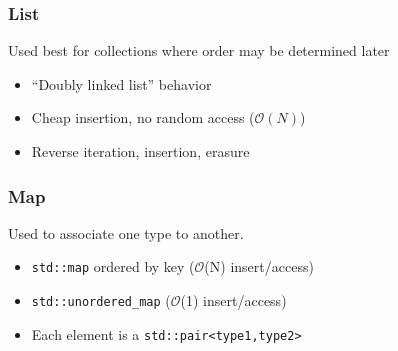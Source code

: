 \documentclass[xcolor=dvipsnames]{beamer}
\begin{document}
\begin{frame}[fragile]
  \frametitle{List}

  Used best for collections where order may be determined later
  \begin{itemize}
  \item ``Doubly linked list'' behavior
  \item Cheap insertion, no random access ($\mathcal{O}(N)$)
  \item Reverse iteration, insertion, erasure
  \end{itemize}

  
\end{frame}

\begin{frame}[fragile]
  \frametitle{Map}

  Used to associate one type to another.
  \begin{itemize}
  \item \texttt{std::map} ordered by key ($\mathcal{O}$(N) insert/access)
  \item \texttt{std::unordered\_map} ($\mathcal{O}$(1) insert/access)
  \item Each element is a \texttt{std::pair<type1,type2>}
  \end{itemize}

  

\end{frame}
\end{document}
